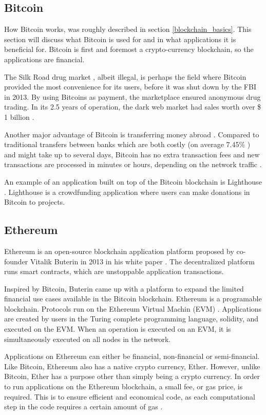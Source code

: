 \subsection{Bitcoin}
How Bitcoin works, was roughly described in section \ref{blockchain_basics}. This section will discuss what Bitcoin is used for and in what applications it is beneficial for. Bitcoin is first and foremost a crypto-currency blockchain, so the applications are financial.

The Silk Road drug market \cite{silk}, albeit illegal, is perhaps the field where Bitcoin provided the most convenience for its users, before it was shut down by the FBI in 2013. By using Bitcoins as payment, the marketplace ensured anonymous drug trading. In its 2.5 years of operation, the dark web market had sales worth over \$ 1 billion \cite{Ethereum_visions}.

Another major advantage of Bitcoin is transferring money abroad \cite{wirex}. Compared to traditional transfers between banks which are both costly (on average 7.45\% \cite{world_bank_group}) and might take up to several days, Bitcoin has no extra transaction fees and new transactions are processed in minutes or hours, depending on the network traffic \cite{transfer_time}. 

An example of an application built on top of the Bitcoin blockchain is Lighthouse \cite{lighthouse}. Lighthouse is a crowdfunding application where users can make donations in Bitcoin to projects. 

\subsection{Ethereum}
Ethereum is an open-source blockchain application platform \cite{ethereum.org} proposed by co-founder Vitalik Buterin \cite{Buterin} in 2013 in his white paper \cite{ether_white_paper}. The decentralized platform runs smart contracts, which are unstoppable application transactions.  

Inspired by Bitcoin, Buterin came up with a platform to expand the limited financial use cases available in the Bitcoin blockchain. Ethereum is a programable blockchain. Protocols run on the Ethereum Virtual Machin (EVM) \cite{ethereum_docs}. Applications are created by users in the Turing complete programming language, solidity, and executed on the EVM. When an operation is executed on an EVM, it is simultaneously executed on all nodes in the network.

Applications on Ethereum can either be financial, non-financial or semi-financial. Like Bitcoin, Ethereum also has a native crypto currency, Ether. However, unlike Bitcoin, Ether has a purpose other than simply being a crypto currency. In order to run applications on the Ethereum blockchain, a small fee, or gas price, is required. This is to ensure efficient and economical code, as each computational step in the code requires a certain amount of gas \cite{ether_white_paper}.

